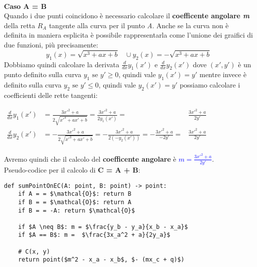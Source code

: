 \\ \newline
\textbf{Caso A = B} \\
Quando i due punti coincidono è necessario calcolare il \textbf{coefficente angolare \textit{m}} della retta $R_A$ tangente alla curva per il punto \textit{A}. Anche se la curva non è definita in maniera esplicita è possibile rappresentarla come l'unione dei graifici di due funzioni, più precisamente:
$$y_1(x) = \sqrt{x^3 + ax + b} \;\;\; \cup y_2(x) = - \sqrt{x^3 + ax + b}$$
Dobbiamo quindi calcolare la derivata $\frac{d}{dx}y_1(x')$ e $\frac{d}{dx}y_2(x')$ dove $(x', y')$ è un punto definito sulla curva $y_1 \text{ se } y' \geq 0$, quindi vale $y_1(x') = y'$ mentre invece è definito sulla curva $y_2 \text{ se } y' \leq 0$, quindi vale $y_2(x') = y'$ possiamo calcolare i coefficienti delle rette tangenti:
\begin{center}
    \begin{math}
        \begin{aligned}
        \frac{d}{dx}y_1(x') &= \frac{3x'^2 + a}{2\sqrt{x'^3 + ax' + b}} = \frac{3x'^2 + a}{2y_1(x')} =& \frac{3x'^2 + a}{2y'} \\
        \frac{d}{dx}y_2(x') &= - \frac{3x'^2 + a}{2\sqrt{x'^3 + ax' + b}} = - \frac{3x'^2 + a}{2(- y_2(x'))} = - \frac{3x'^2 + a}{-2y'} =& \frac{3x'^2 + a}{2y'}
        \end{aligned}
    \end{math}
\end{center}
Avremo quindi che il calcolo del \textbf{coefficente angolare} è \textcolor{blue}{$m = \frac{3x'^2 + a}{2y'}$}. \\
Pseudo-codice per il calcolo di \textbf{C = A + B}:
\begin{lstlisting}[label=lst:rho-polland, basicstyle=\small, mathescape=true]
def sumPointOnEC(A: point, B: point) -> point:
    if A = = $\mathcal{O}$: return B
    if B = = $\mathcal{O}$: return A
    if B = = -A: return $\mathcal{O}$

    if $A \neq B$: m = $\frac{y_b - y_a}{x_b - x_a}$
    if $A == B$: m =  $\frac{3x_a^2 + a}{2y_a}$
        
    # C(x, y)
    return point($m^2 - x_a - x_b$, $- (mx_c + q)$)
\end{lstlisting}

